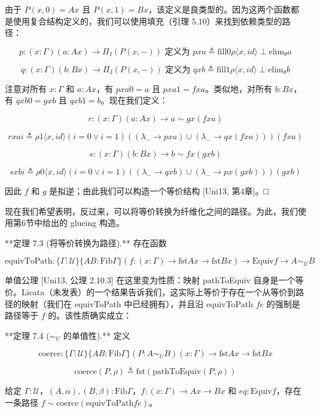 \documentclass{ctexart}
\theoremstyle{plain}
\theoremstyle{definition}
\theoremstyle{definition}
\theoremstyle{definition}
\theoremstyle{definition}
\numberwithin{equation}{section}
\begin{document}
由于 $P(x, 0) = A x$ 且 $P(x, 1) = B x$，该定义是良类型的。因为这两个函数都是使用复合结构定义的，我们可以使用填充（引理 5.10）来找到依赖类型的路径：

\[p : (x : \Gamma)(a : A x) \to \Pi_I (P(x, -)) \text{ 定义为 } p x a \triangleq \text{fill} 0 \rho \langle x, id \rangle \perp \text{elim}_\theta a\]

\[q : (x : \Gamma)(b : B x) \to \Pi_I (P(x, -)) \text{ 定义为 } q x b \triangleq \text{fill} 1 \rho \langle x, id \rangle \perp \text{elim}_\theta b\]

注意对所有 $x : \Gamma$ 和 $a : A x$，有 $p x a 0 = a$ 且 $p x a 1 = f x a$。类似地，对所有 $b : B x$，有 $q x b 0 = g x b$ 且 $q x b 1 = b$。现在我们定义：

\[r : (x : \Gamma)(a : A x) \to a \sim g x (f x a)\]

\[r x a i \triangleq \rho 1 \langle x, id \rangle (i = 0 \lor i = 1) (( \lambda_- \to p x a) \cup (\lambda_- \to q x (f x a))) (f x a)\]

\[s : (x : \Gamma)(b : B x) \to b \sim f x (g x b)\]

\[s x b i \triangleq \rho 0 \langle x, id \rangle (i = 0 \lor i = 1) (( \lambda_- \to q x b) \cup (\lambda_- \to p x (g x b))) (g x b)\]

因此 $f$ 和 $g$ 是拟逆；由此我们可以构造一个等价结构 [Uni13, 第4章]。□

现在我们希望表明，反过来，可以将等价转换为纤维化之间的路径。为此，我们使用第6节中给出的 glueing 构造。

**定理 7.3 (将等价转换为路径).** 存在函数

\[\text{equivToPath} : \{\Gamma : \mathcal{U}\} \{A B : \text{Fib} \Gamma\} (f : (x : \Gamma) \to \text{fst} A x \to \text{fst} B x) \to \text{Equiv} f \to A \sim_{\mathcal{U}} B\]

单值公理 [Uni13, 公理 2.10.3] 在这里变为性质：映射 pathToEquiv 自身是一个等价。Licata（未发表）的一个结果告诉我们，这实际上等价于存在一个从等价到路径的映射（我们在 equivToPath 中已经拥有），并且沿 equivToPath $f e$ 的强制是路径等于 $f$ 的。该性质确实成立：

**定理 7.4 ($\sim_U$ 的单值性).** 定义

\[\text{coerce} : \{\Gamma : \mathcal{U}\} \{A B : \text{Fib} \Gamma\} (P : A \sim_U B) (x : \Gamma) \to \text{fst} A x \to \text{fst} B x\]

\[\text{coerce}(P, \rho) \triangleq \text{fst}(\text{pathToEquiv}(P, \rho))\]

给定 $\Gamma : \mathcal{U}$，$(A, \alpha), (B, \beta) : \text{Fib} \Gamma$，$f : (x : \Gamma) \to A x \to B x$ 和 $eq : \text{Equiv} f$，存在一条路径 $f \sim \text{coerce}(\text{equivToPath} f e)$。
\end{document}
